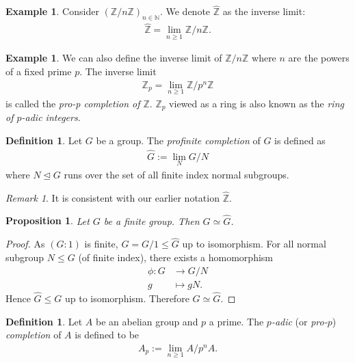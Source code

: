 \documentclass[12pt]{report}
\theoremstyle{plain}
\newtheorem{proposition}[theorem]{Proposition}
\theoremstyle{remark}
\newtheorem*{remark}{Remark}
\theoremstyle{definition}
\newtheorem{definition}[theorem]{Definition}
\newtheorem{example}[theorem]{Example}
\newcommand{\N}{\mathbb{N}}
\newcommand{\Z}{\mathbb{Z}}
\begin{document}
\begin{example}
    Consider $(\Z/n\Z)_{n\in \N}$. We denote $\hat{\Z}$ as the inverse limit:
    \begin{align*}
        \hat{\Z} = \lim_{n\ge 1} \Z/n\Z.
    \end{align*}
\end{example}

\begin{example}
    We can also define the inverse limit of $\Z/n\Z$ where $n$ are the powers of a fixed prime $p$. The inverse limit
    \begin{align*}
        \Z_p = \lim_{n\ge 1} \Z/p^n\Z
    \end{align*}
    is called the \emph{pro-p completion of $\Z$}. $\Z_p$ viewed as a ring is also known as the \emph{ring of $p$-adic integers}.
\end{example}

\begin{definition}
    Let $G$ be a group. The \emph{profinite completion} of $G$ is defined as
    \begin{align*}
        \hat{G}:=\lim_{N} G/N
    \end{align*}
    where $N\trianglelefteq G$ runs over the set of all finite index normal subgroups.
\end{definition}
\begin{remark}
    It is consistent with our earlier notation $\hat{\Z}$.
\end{remark}

\begin{proposition}
    Let $G$ be a finite group. Then $G\simeq \hat{G}$.
\end{proposition}
\begin{proof}
    As $(G:1)$ is finite, $G=G/1\le \hat{G}$ up to isomorphism. For all normal subgroup $N\le G$ (of finite index), there exists a homomorphism
    \begin{align*}
        \phi : G &\rightarrow G/N \\
        g &\mapsto gN.
    \end{align*}
    Hence $\hat{G}\le G$ up to isomorphism. Therefore $G\simeq \hat{G}$.
\end{proof}

\begin{definition}
    Let $A$ be an abelian group and $p$ a prime. The \emph{$p$-adic} (or \emph{pro-}$p$) \emph{completion} of $A$ is defined to be
    \begin{align*}
        A_p := \lim_{n\ge 1} A/p^n A.
    \end{align*}
\end{definition}
\end{document}

